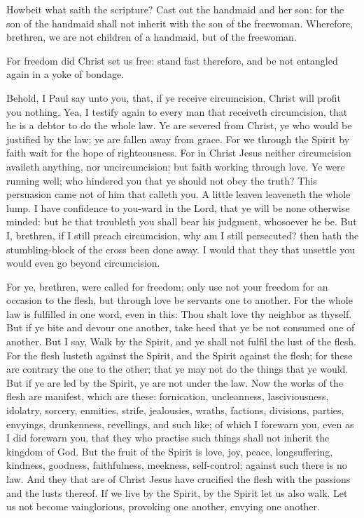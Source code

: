 Howbeit what saith the scripture? Cast out the handmaid and her son: for the son of the handmaid shall not inherit with the son of the freewoman. Wherefore, brethren, we are not children of a handmaid, but of the freewoman. 

For freedom did Christ set us free: stand fast therefore, and be not entangled again in a yoke of bondage.  

Behold, I Paul say unto you, that, if ye receive circumcision, Christ will profit you nothing. Yea, I testify again to every man that receiveth circumcision, that he is a debtor to do the whole law. Ye are severed from Christ, ye who would be justified by the law; ye are fallen away from grace. For we through the Spirit by faith wait for the hope of righteousness. For in Christ Jesus neither circumcision availeth anything, nor uncircumcision; but faith working through love. Ye were running well; who hindered you that ye should not obey the truth? This persuasion came not of him that calleth you. A little leaven leaveneth the whole lump. I have confidence to you-ward in the Lord, that ye will be none otherwise minded: but he that troubleth you shall bear his judgment, whosoever he be. But I, brethren, if I still preach circumcision, why am I still persecuted? then hath the stumbling-block of the cross been done away. I would that they that unsettle you would even go beyond circumcision.  

For ye, brethren, were called for freedom; only use not your freedom for an occasion to the flesh, but through love be servants one to another. For the whole law is fulfilled in one word, even in this: Thou shalt love thy neighbor as thyself. But if ye bite and devour one another, take heed that ye be not consumed one of another.  But I say, Walk by the Spirit, and ye shall not fulfil the lust of the flesh. For the flesh lusteth against the Spirit, and the Spirit against the flesh; for these are contrary the one to the other; that ye may not do the things that ye would. But if ye are led by the Spirit, ye are not under the law. Now the works of the flesh are manifest, which are these: fornication, uncleanness, lasciviousness, idolatry, sorcery, enmities, strife, jealousies, wraths, factions, divisions, parties, envyings, drunkenness, revellings, and such like; of which I forewarn you, even as I did forewarn you, that they who practise such things shall not inherit the kingdom of God. But the fruit of the Spirit is love, joy, peace, longsuffering, kindness, goodness, faithfulness, meekness, self-control; against such there is no law. And they that are of Christ Jesus have crucified the flesh with the passions and the lusts thereof.  If we live by the Spirit, by the Spirit let us also walk. Let us not become vainglorious, provoking one another, envying one another. 



